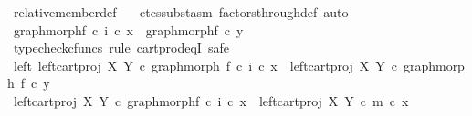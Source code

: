 \begin{isabellebody}
\ relative{\isacharunderscore}{\kern0pt}member{\isacharunderscore}{\kern0pt}def{}\ \isamarkupfalse%
\ {\isacharparenleft}{\kern0pt}{\isacharminus}{\kern0pt}{\isacharcomma}{\kern0pt}\ etcs{\isacharunderscore}{\kern0pt}subst{\isacharunderscore}{\kern0pt}asm\ factors{\isacharunderscore}{\kern0pt}through{\isacharunderscore}{\kern0pt}def{}{\isacharcomma}{\kern0pt}\ auto{\isacharparenright}{\kern0pt}\isanewline
\isanewline
\ \ \ \ \ \ \isamarkupfalse%
\ {\isachardoublequoteopen}graph{\isacharunderscore}{\kern0pt}morph{\isacharparenleft}{\kern0pt}f{\isacharparenright}{\kern0pt}\ {\isasymcirc}\isactrlsub c\ i\ {\isasymcirc}\isactrlsub c\ x{\isacharprime}{\kern0pt}\ {\isacharequal}{\kern0pt}\ graph{\isacharunderscore}{\kern0pt}morph{\isacharparenleft}{\kern0pt}f{\isacharparenright}{\kern0pt}\ {\isasymcirc}\isactrlsub c\ y{\isacharprime}{\kern0pt}{\isachardoublequoteclose}\isanewline
\ \ \ \ \ \ \isamarkupfalse%
\ {\isacharparenleft}{\kern0pt}typecheck{\isacharunderscore}{\kern0pt}cfuncs{\isacharcomma}{\kern0pt}\ rule\ cart{\isacharunderscore}{\kern0pt}prod{\isacharunderscore}{\kern0pt}eqI{\isacharcomma}{\kern0pt}\ safe{\isacharparenright}{\kern0pt}\isanewline
\ \ \ \ \ \ \ \ \isamarkupfalse%
\ left{\isacharcolon}{\kern0pt}\ {\isachardoublequoteopen}left{\isacharunderscore}{\kern0pt}cart{\isacharunderscore}{\kern0pt}proj\ X\ Y\ {\isasymcirc}\isactrlsub c\ graph{\isacharunderscore}{\kern0pt}morph\ f\ {\isasymcirc}\isactrlsub c\ i\ {\isasymcirc}\isactrlsub c\ x{\isacharprime}{\kern0pt}\ {\isacharequal}{\kern0pt}\ left{\isacharunderscore}{\kern0pt}cart{\isacharunderscore}{\kern0pt}proj\ X\ Y\ {\isasymcirc}\isactrlsub c\ graph{\isacharunderscore}{\kern0pt}morph\ f\ {\isasymcirc}\isactrlsub c\ y{\isacharprime}{\kern0pt}{\isachardoublequoteclose}\isanewline
\ \ \ \ \ \ \ \ \isamarkupfalse%
\ {\isacharminus}{\kern0pt}\isanewline
\ \ \ \ \ \ \ \ \ \ \isamarkupfalse%
\ {\isachardoublequoteopen}left{\isacharunderscore}{\kern0pt}cart{\isacharunderscore}{\kern0pt}proj\ X\ Y\ {\isasymcirc}\isactrlsub c\ graph{\isacharunderscore}{\kern0pt}morph{\isacharparenleft}{\kern0pt}f{\isacharparenright}{\kern0pt}\ {\isasymcirc}\isactrlsub c\ i\ {\isasymcirc}\isactrlsub c\ x{\isacharprime}{\kern0pt}\ {\isacharequal}{\kern0pt}\ left{\isacharunderscore}{\kern0pt}cart{\isacharunderscore}{\kern0pt}proj\ X\ Y\ {\isasymcirc}\isactrlsub c\ m\ {\isasymcirc}\isactrlsub c\ x{\isacharprime}{\kern0pt}{\isachardoublequoteclose}\isanewline
\ \ \ \ \ \ \ \ \ \ \ \ \isamarkupfalse%

\end{isabellebody}
